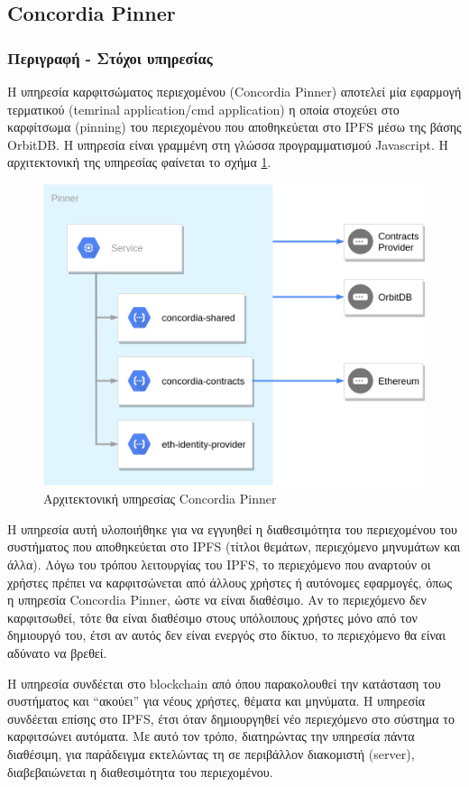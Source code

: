 \subsection{Concordia Pinner} \label{subsection:4-3-4-concordia-pinner-service}

\subsubsection{Περιγραφή - Στόχοι υπηρεσίας}

Η υπηρεσία καρφιτσώματος περιεχομένου (Concordia Pinner) αποτελεί μία εφαρμογή τερματικού (temrinal application/cmd application) η οποία στοχεύει στο καρφίτσωμα (pinning) του περιεχομένου που αποθηκεύεται στο IPFS μέσω της βάσης OrbitDB. Η υπηρεσία είναι γραμμένη στη γλώσσα προγραμματισμού Javascript. Η αρχιτεκτονική της υπηρεσίας φαίνεται το σχήμα \ref{figure:4-3-concordia-pinner-architecture}.

\begin{figure}[H]
    \centering
    \includegraphics[width=.6\textwidth]{assets/figures/chapter-4/4.3.architecture-4.3.4.concordia-pinner-architecture.png}
    \caption{Αρχιτεκτονική υπηρεσίας Concordia Pinner}
    \label{figure:4-3-concordia-pinner-architecture}
\end{figure}

Η υπηρεσία αυτή υλοποιήθηκε για να εγγυηθεί η διαθεσιμότητα του περιεχομένου του συστήματος που αποθηκεύεται στο IPFS (τίτλοι θεμάτων, περιεχόμενο μηνυμάτων και άλλα). Λόγω του τρόπου λειτουργίας του IPFS, το περιεχόμενο που αναρτούν οι χρήστες πρέπει να καρφιτσώνεται από άλλους χρήστες ή αυτόνομες εφαρμογές, όπως η υπηρεσία Concordia Pinner, ώστε να είναι διαθέσιμο. Αν το περιεχόμενο δεν καρφιτσωθεί, τότε θα είναι διαθέσιμο στους υπόλοιπους χρήστες μόνο από
τον δημιουργό του, έτσι αν αυτός δεν είναι ενεργός στο δίκτυο, το περιεχόμενο θα είναι αδύνατο να βρεθεί.

Η υπηρεσία συνδέεται στο blockchain από όπου παρακολουθεί την κατάσταση του συστήματος και ``ακούει'' για νέους χρήστες, θέματα και μηνύματα. Η υπηρεσία συνδέεται επίσης στο IPFS, έτσι όταν δημιουργηθεί νέο περιεχόμενο στο σύστημα το καρφιτσώνει αυτόματα. Με αυτό τον τρόπο, διατηρώντας την υπηρεσία πάντα διαθέσιμη, για παράδειγμα εκτελώντας τη σε περιβάλλον διακομιστή (server), διαβεβαιώνεται η διαθεσιμότητα του περιεχομένου.

